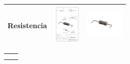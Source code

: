 \begin{itemize}
\begin{table} [H]
\begin{tabular}   {| c |  c |  c | }
        Resistencia & \includegraphics[height=19mm]{1/img/Resistencia.pdf}  & 
       \includegraphics[width=19mm]{1/img/Resistencia_1.pdf} \\
        \hline 
       
        
        \end{tabular} 
       
         \label {tab : my_label}  \label {}
          \end{table} 
    
      \begin{tabular}{c|c}
           &  \\
           & 
      \end{tabular}
    
    \end{itemize}
